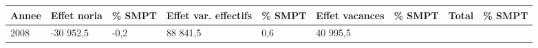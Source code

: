 \begin{longtable}[]{@{}lllllllll@{}}
\toprule
\begin{minipage}[b]{0.05\columnwidth}\raggedright
Annee\strut
\end{minipage} & \begin{minipage}[b]{0.10\columnwidth}\raggedright
Effet noria\strut
\end{minipage} & \begin{minipage}[b]{0.06\columnwidth}\raggedright
\% SMPT\strut
\end{minipage} & \begin{minipage}[b]{0.16\columnwidth}\raggedright
Effet var. effectifs\strut
\end{minipage} & \begin{minipage}[b]{0.06\columnwidth}\raggedright
\% SMPT\strut
\end{minipage} & \begin{minipage}[b]{0.12\columnwidth}\raggedright
Effet vacances\strut
\end{minipage} & \begin{minipage}[b]{0.06\columnwidth}\raggedright
\% SMPT\strut
\end{minipage} & \begin{minipage}[b]{0.09\columnwidth}\raggedright
Total\strut
\end{minipage} & \begin{minipage}[b]{0.06\columnwidth}\raggedright
\% SMPT\strut
\end{minipage}\tabularnewline
\midrule
\endhead
\begin{minipage}[t]{0.05\columnwidth}\raggedright
2008\strut
\end{minipage} & \begin{minipage}[t]{0.10\columnwidth}\raggedright
-30 952,5\strut
\end{minipage} & \begin{minipage}[t]{0.06\columnwidth}\raggedright
-0,2\strut
\end{minipage} & \begin{minipage}[t]{0.16\columnwidth}\raggedright
88 841,5\strut
\end{minipage} & \begin{minipage}[t]{0.06\columnwidth}\raggedright
0,6\strut
\end{minipage} & \begin{minipage}[t]{0.12\columnwidth}\raggedright
40 995,5\strut
\end{minipage} & \begin{minipage}[t]{0.06\columnwidth}\raggedright

\end{minipage}
\end{longtable}
